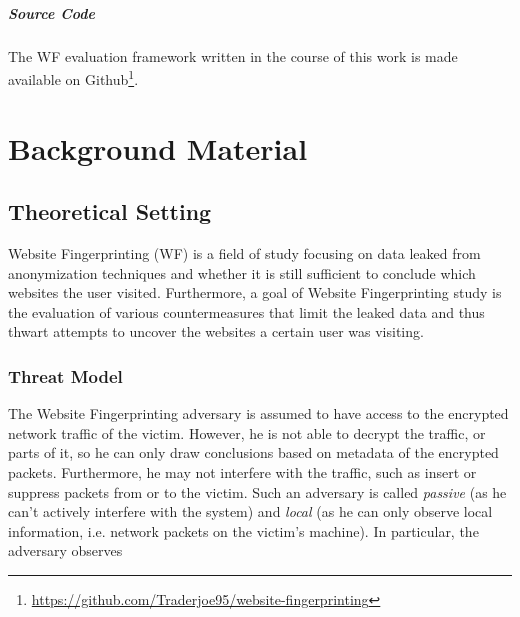 \documentclass[
	ruledheaders=chapter,
	class=report,
	thesis={type=master, department=inf},
	accentcolor=1c,
	custommargins=true,
	marginpar=false,
	parskip=half-,
	fontsize=11pt,
]{tudapub}
\begin{document}
	
	\paragraph{Source Code} The WF evaluation framework written in the course of this work is made available on Github\footnote{\url{https://github.com/Traderjoe95/website-fingerprinting}}. 

	\chapter{Background Material}
	\label{fingerprinting}

	\section{Theoretical Setting}
	\label{theoretical}
	
	Website Fingerprinting (WF) is a field of study focusing on data leaked from anonymization 
	techniques and whether it is still sufficient to conclude which websites the user visited.
	Furthermore, a goal of Website Fingerprinting study is the evaluation of various countermeasures
	that limit the leaked data and thus thwart attempts to uncover the websites a certain user was
	visiting.
	
	\subsection{Threat Model}
	\label{theoretical:threat_model}
	
	The Website Fingerprinting adversary is assumed to have access to the encrypted network traffic of the victim. However, he is not able to decrypt the traffic, or parts of it, so he can only draw conclusions based on metadata of the encrypted packets. Furthermore, he may not interfere with the traffic, such as insert or suppress packets from or to the victim. Such an adversary is called \textit{passive} (as he can't actively interfere with the system) and \textit{local} (as he can only observe local information, i.e. network packets on the victim's machine). In particular, the adversary observes 
	
\end{document}
